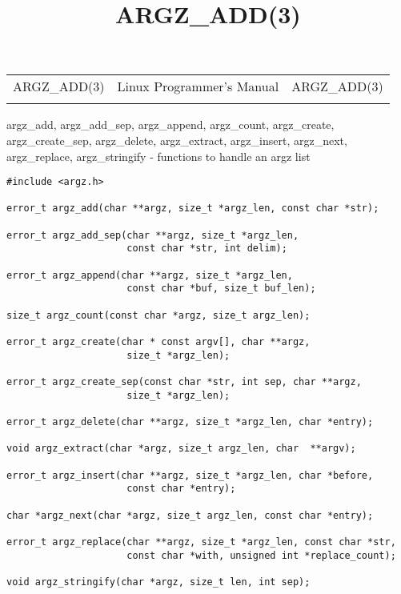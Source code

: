 \documentclass[]{article}
\title{ARGZ\_ADD(3)}
\author{}
\date{}
\begin{document}
\maketitle

\begin{longtable}[c]{@{}lll@{}}
\toprule\addlinespace
ARGZ\_ADD(3) & Linux Programmer's Manual & ARGZ\_ADD(3)
\\\addlinespace
\bottomrule
\end{longtable}


argz\_add, argz\_add\_sep, argz\_append, argz\_count, argz\_create,
argz\_create\_sep, argz\_delete, argz\_extract, argz\_insert,
argz\_next, argz\_replace, argz\_stringify - functions to handle an argz
list


\begin{verbatim}
#include <argz.h>
 
error_t argz_add(char **argz, size_t *argz_len, const char *str);
 
error_t argz_add_sep(char **argz, size_t *argz_len,
                     const char *str, int delim);
 
error_t argz_append(char **argz, size_t *argz_len,
                     const char *buf, size_t buf_len);
 
size_t argz_count(const char *argz, size_t argz_len);
 
error_t argz_create(char * const argv[], char **argz,
                     size_t *argz_len);
 
error_t argz_create_sep(const char *str, int sep, char **argz,
                     size_t *argz_len);
 
error_t argz_delete(char **argz, size_t *argz_len, char *entry);
 
void argz_extract(char *argz, size_t argz_len, char  **argv);
 
error_t argz_insert(char **argz, size_t *argz_len, char *before,
                     const char *entry);
 
char *argz_next(char *argz, size_t argz_len, const char *entry);
 
error_t argz_replace(char **argz, size_t *argz_len, const char *str,
                     const char *with, unsigned int *replace_count);
 
void argz_stringify(char *argz, size_t len, int sep);
\end{verbatim}

\end{document}
